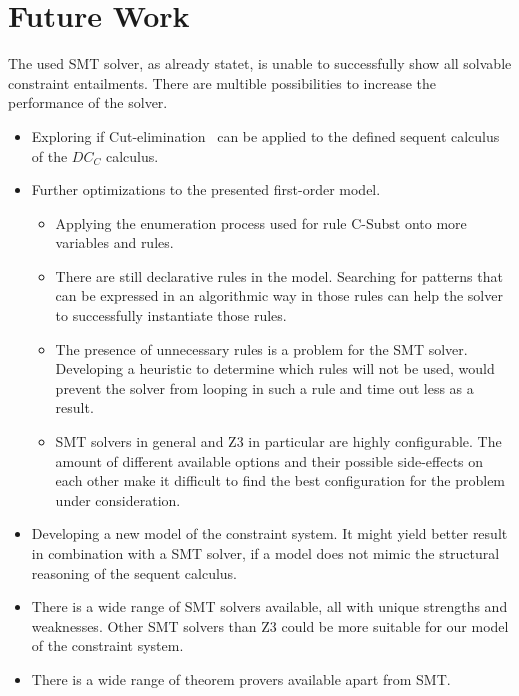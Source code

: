 \section{Future Work}
The used SMT solver, as already statet, is unable to successfully
show all solvable constraint entailments.
There are multible possibilities to increase the performance of the solver.
\begin{itemize}
  \item Exploring if Cut-elimination~\cite{cutelim} can be applied to the defined sequent calculus
        of the $DC_C$ calculus.
  \item Further optimizations to the presented first-order model.
  \begin{itemize}
    \item Applying the enumeration process used for rule C-Subst
          onto more variables and rules.
    \item There are still declarative rules in the model.
          Searching for patterns that can be expressed in an algorithmic
          way in those rules can help the solver to successfully instantiate those rules.
    \item The presence of unnecessary rules is a problem for the SMT solver.
          Developing a heuristic to determine which rules will not be used,
          would prevent the solver from looping in such a rule and time out less as a result.
    \item SMT solvers in general and Z3 in particular are highly configurable.
          The amount of different available options and their possible side-effects on each other
          make it difficult to find the best configuration for the problem under consideration.
  \end{itemize}
  \item Developing a new model of the constraint system.
        It might yield better result in combination with a SMT solver,
        if a model does not mimic the structural reasoning of the sequent calculus.
  \item There is a wide range of SMT solvers available,
        all with unique strengths and weaknesses.
        Other SMT solvers than Z3 could be more suitable for our model of the constraint system.
  \item There is a wide range of theorem provers available apart from SMT.
\end{itemize}

